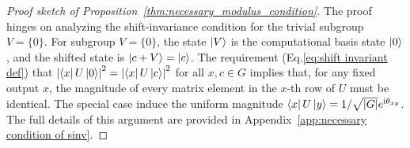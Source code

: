 \documentclass[reprint, aps, prl, superscriptaddress]{revtex4-2}
\newcommand{\ii}{\mathrm{i}}
\begin{document}
\begin{proof}[Proof sketch of Proposition~\ref{thm:necessary_modulus_condition}]
The proof hinges on analyzing the shift-invariance condition for the trivial subgroup $V = \{0\}$. For subgroup $V = \{0\}$, the state $\ket{V}$ is the computational basis state $\ket{0}$, and the shifted state is $\ket{c+V} = \ket{c}$. The requirement (Eq.\eqref{eq:shift invariant def}) that $\left|\bra{x}U\ket{0}\right|^2 = \left|\bra{x}U\ket{c}\right|^2$ for all $x, c \in G$ implies that, for any fixed output $x$, the magnitude of every matrix element in the $x$-th row of $U$ must be identical. The special case induce the uniform magnitude $\bra{x}U\ket{y} = 1/\sqrt{|G|} e^{\ii \theta_{xy}}$. The full details of this argument are provided in Appendix~\ref{app:necessary condition of sinv}.
\end{proof}











\end{document}
